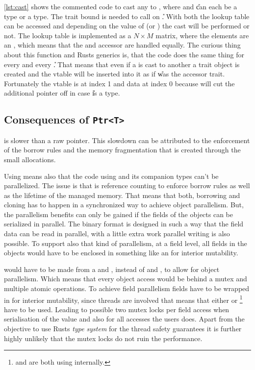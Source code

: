 \documentclass[thesis]{subfiles}
\begin{document}
    \autoref{lst:cast} shows the commented code to cast any \PtrT to , where \T and \U can each be a \struct type or a \trait type.
    The \CastAble trait bound is needed to call  on \U.
    With both \ids the lookup table can be accessed and depending on the value of \OptionT (\SomeT or \None) the cast will be performed or not.
    The lookup table is implemented as a $N \times M$ matrix, where the elements are an , which means that the \struct and accessor \trait are handled equally.
    The curious thing about this function and Rusts generics is, that the code does the same thing for every \T and every \U.
    That means that even if a \struct is cast to another \struct a trait object is created and the vtable will be inserted into it as if \U was the accessor trait.
    Fortunately the vtable is at index 1 and data at index 0 because  will cut the additional pointer off in case \U is a \struct type.

  \subsection{Consequences of \texttt{Ptr<T>}}\label{sec:badptr}
    \PtrT is slower than a raw pointer.
    This slowdown can be attributed to the enforcement of the borrow rules and the memory fragmentation that is created through the small allocations.

    Using \PtrT means also that the code using \PtrT and its companion types can't be parallelized.
    The issue is that \PtrT is reference counting to enforce borrow rules as well as the lifetime of the managed memory.
    That means that both, borrowing and cloning has to happen in a synchronized way to achieve object parallelism.
    But, the parallelism benefits can only be gained if the fields of the objects can be serialized in parallel.
    The binary format is designed in such a way that the field data can be read in parallel, with a little extra work parallel writing is also possible.
    To support also that kind of parallelism, at a field level, all fields in the objects would have to be enclosed in something like an \UnsafeCellT for interior mutability.

    \PtrT would have to be made from a \ArcT and \RwLockT, instead of \RcT and \RefCellT, to allow for object parallelism.
    Which means that every object access would be behind a mutex and multiple atomic operations\autocite[std::sync::Arc, std::sync::RwLock]{rust-doc}.
    To achieve field parallelism fields have to be wrapped in \UnsafeCellT for interior mutability, since threads are involved that means that either \MutexT or \RwLockT\footnote{
      \MutexT and \RwLockT are both using \UnsafeCellT internally.\autocite[std::sync::Mutex, std::sync::RwLock]{rust-doc}
    } have to be used.
    Leading to possible two mutex locks per field access when serialisation of the value and also for all accesses the users does.
    Apart from the objective to use Rusts \emph{type system} for the thread safety guarantees it is further highly unlikely that the mutex locks do not ruin the performance.
\end{document}
